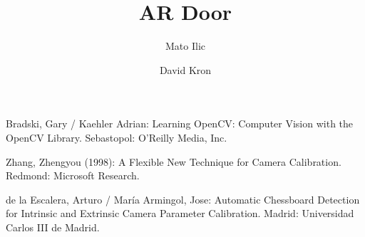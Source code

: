 \documentclass{llncs}
\begin{document}
%
\pagestyle{headings}  %
%
\title{AR Door}
%
%
\author{Mato Ilic \and David Kron}
%
%
%

\maketitle              %

\tableofcontents
\newpage


\newpage




\newpage

%
%
%
\newpage
\begin{thebibliography}{5}

Bradski, Gary / Kaehler Adrian:
Learning OpenCV: Computer Vision with the OpenCV Library.
Sebastopol: O'Reilly Media, Inc.

Zhang, Zhengyou (1998): A Flexible New Technique for Camera Calibration. 
Redmond: Microsoft Research.

de la Escalera, Arturo / María Armingol, Jose: Automatic Chessboard Detection for Intrinsic and Extrinsic Camera Parameter Calibration. 
Madrid: Universidad Carlos III de Madrid.

\end{thebibliography}
\end{document}
